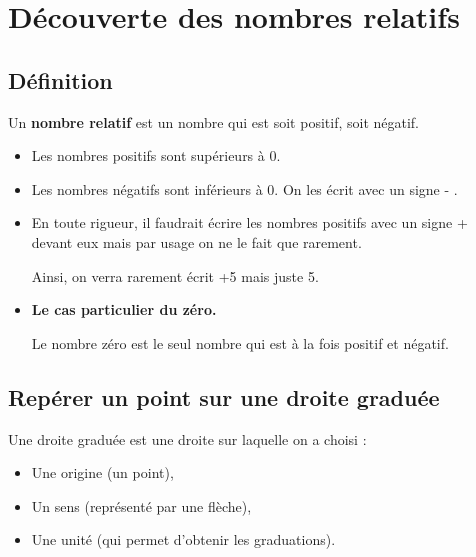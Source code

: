 \documentclass[a4paper]{book}
\begin{document}
\setcounter{chapter}{4}
\renewcommand{\monTitre}{Découverte des nombres relatifs}
\chapter{\monTitre}
\thispagestyle{fancy} 

\section{Définition}

    \begin{definition}
        Un \textbf{nombre relatif} est un nombre qui est soit positif, soit négatif.
        \begin{itemize}
            \item Les nombres positifs sont supérieurs à 0.
            \item Les nombres négatifs sont inférieurs à 0. On les écrit avec un signe \og - \fg.
        \end{itemize}
    \end{definition}


    \begin{remarque}
        \begin{itemize}
            \item En toute rigueur, il faudrait écrire les nombres positifs avec un signe \og + \fg devant eux mais par usage on ne le fait que rarement.
    
            Ainsi, on verra rarement écrit +5 mais juste 5.

            \item \textbf{Le cas particulier du zéro.}

            Le nombre zéro est le seul nombre qui est à la fois positif et négatif.
        \end{itemize}   
    \end{remarque}


\section{Repérer un point sur une droite graduée}

    \begin{definition} 
        Une droite graduée est une droite sur laquelle on a choisi :
        \begin{itemize}
            \item Une origine (un point),
            \item Un sens (représenté par une flèche),
            \item Une unité (qui permet d'obtenir les graduations).
        \end{itemize}
    \end{definition}
\end{document}
